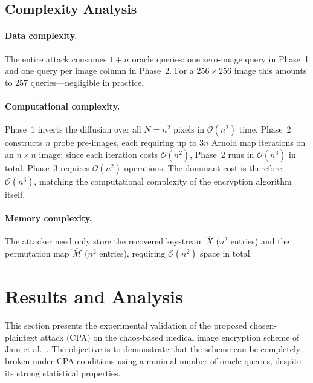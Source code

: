 \subsection{Complexity Analysis}

\paragraph{Data complexity.}
The entire attack consumes $1 + n$ oracle queries: one zero-image query in Phase~1 and one query per image column in Phase~2. For a $256 \times 256$ image this amounts to 257 queries---negligible in practice.

\paragraph{Computational complexity.}
Phase~1 inverts the diffusion over all $N = n^2$ pixels in $\mathcal{O}(n^2)$ time. Phase~2 constructs $n$ probe pre-images, each requiring up to $3n$ Arnold map iterations on an $n \times n$ image; since each iteration costs $\mathcal{O}(n^2)$, Phase~2 runs in $\mathcal{O}(n^3)$ in total. Phase~3 requires $\mathcal{O}(n^2)$ operations. The dominant cost is therefore $\mathcal{O}(n^3)$, matching the computational complexity of the encryption algorithm itself.

\paragraph{Memory complexity.}
The attacker need only store the recovered keystream $\hat{X}$ ($n^2$ entries) and the permutation map $\hat{\mathcal{M}}$ ($n^2$ entries), requiring $\mathcal{O}(n^2)$ space in total.
\section{Results and Analysis}
\label{sec:crypto-results}

This section presents the experimental validation of the proposed chosen-plaintext attack (CPA) on the chaos-based medical image encryption scheme of Jain et al.~\cite{jain2021medical}. The objective is to demonstrate that the scheme can be completely broken under CPA conditions using a minimal number of oracle queries, despite its strong statistical properties.

